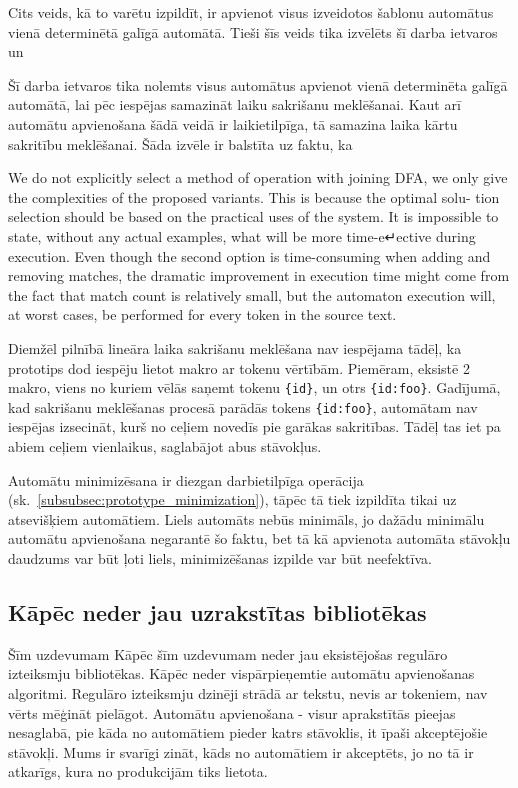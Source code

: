 Cits veids, kā to varētu izpildīt, ir apvienot visus izveidotos šablonu automātus vienā determinētā galīgā automātā. Tieši šīs veids tika izvēlēts šī darba ietvaros un 

Šī darba ietvaros tika nolemts visus automātus apvienot vienā determinēta galīgā automātā, lai pēc iespējas samazināt laiku sakrišanu meklēšanai. Kaut arī automātu apvienošana šādā veidā ir laikietilpīga, tā samazina laika kārtu sakritību meklēšanai. Šāda izvēle ir balstīta uz faktu, ka 


We do not explicitly select a method of operation with joining DFA, we only give the complexities of the proposed variants. This is because the optimal solu-
tion selection should be based on the practical uses of the system. It is impossible to state, without any actual examples, what will be more time-e↵ective during execution. Even though the second option is time-consuming when adding and removing matches, the dramatic improvement in execution time might come from the fact that match count is relatively small, but the automaton execution will, at worst cases, be performed for every token in the source text.


Diemžēl pilnībā lineāra laika sakrišanu meklēšana nav iespējama tādēļ, ka prototips dod iespēju lietot makro ar tokenu vērtībām. Piemēram, eksistē 2 makro, viens no kuriem vēlās saņemt tokenu \verb|{id}|, un otrs \verb|{id:foo}|. Gadījumā, kad sakrišanu meklēšanas procesā parādās tokens \verb|{id:foo}|, automātam nav iespējas izsecināt, kurš no ceļiem novedīs pie garākas sakritības. Tādēļ tas iet pa abiem ceļiem vienlaikus, saglabājot abus stāvokļus.

Automātu minimizēsana ir diezgan darbietilpīga operācija (sk.~\ref{subsubsec:prototype_minimization}), tāpēc tā tiek izpildīta tikai uz atsevišķiem automātiem. Liels automāts nebūs minimāls, jo dažādu minimālu automātu apvienošana negarantē šo faktu, bet tā kā apvienota automāta stāvokļu daudzums var būt ļoti liels, minimizēšanas izpilde var būt neefektīva.

\subsection{Kāpēc neder jau uzrakstītas bibliotēkas}

Šīm uzdevumam 
Kāpēc šīm uzdevumam neder jau eksistējošas regulāro izteiksmju bibliotēkas. Kāpēc  neder vispārpieņemtie automātu apvienošanas algoritmi.
Regulāro izteiksmju dzinēji strādā ar tekstu, nevis ar tokeniem, nav vērts mēģināt pielāgot. Automātu apvienošana - visur aprakstītās pieejas nesaglabā, pie kāda no automātiem pieder katrs stāvoklis, it īpaši akceptējošie stāvokļi. Mums ir svarīgi zināt, kāds no automātiem ir akceptēts, jo no tā ir atkarīgs, kura no produkcijām tiks lietota. 



